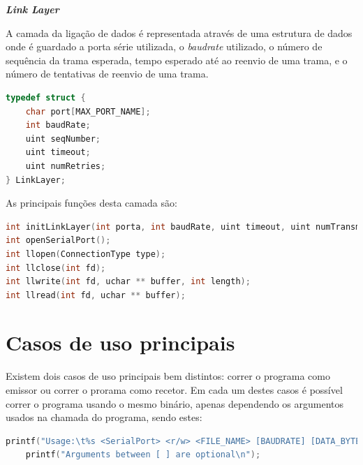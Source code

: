\documentclass[a4paper, 11pt]{article}
\begin{document}
\large\textbf{\textit{Link Layer}}\\
\normalsize

A camada da ligação de dados é representada através de uma estrutura de dados onde é guardado a porta série utilizada, o \textit{baudrate} utilizado, o número de sequência da trama esperada, tempo esperado até ao reenvio de uma trama, e o número de tentativas de reenvio de uma trama.

\begin{lstlisting}[language=C]
typedef struct {
	char port[MAX_PORT_NAME];
	int baudRate;
	uint seqNumber;
	uint timeout;
	uint numRetries;
} LinkLayer;
\end{lstlisting}

As principais funções desta camada são:

\begin{lstlisting}[language=C]
int initLinkLayer(int porta, int baudRate, uint timeout, uint numTransmissions);
int openSerialPort();
int llopen(ConnectionType type);
int llclose(int fd);
int llwrite(int fd, uchar ** buffer, int length);
int llread(int fd, uchar ** buffer);
\end{lstlisting}

\section{Casos de uso principais}

Existem dois casos de uso principais bem distintos: correr o programa como emissor ou correr o prorama como recetor. Em cada um destes casos é possível correr o programa usando o mesmo binário, apenas dependendo os argumentos usados na chamada do programa, sendo estes:

\begin{lstlisting}[language=C]
	printf("Usage:\t%s <SerialPort> <r/w> <FILE_NAME> [BAUDRATE] [DATA_BYTES] [NUM_RETRIES] [TIMEOUT]\n", progName);
	printf("Arguments between [ ] are optional\n");
\end{lstlisting}
\end{document}
